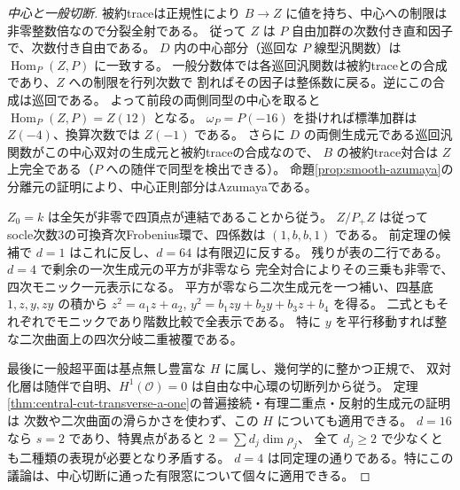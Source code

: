 \begin{proof}[中心と一般切断]
被約traceは正規性により $B\to Z$ に値を持ち、中心への制限は非零整数倍なので分裂全射である。
従って $Z$ は $P$ 自由加群の次数付き直和因子で、次数付き自由である。
$D$ 内の中心部分（巡回な $P$ 線型汎関数）は $\operatorname{Hom}_P(Z,P)$ に一致する。
一般分数体では各巡回汎関数は被約traceとの合成であり、$Z$ への制限を行列次数で
割ればその因子は整係数に戻る。逆にこの合成は巡回である。
よって前段の両側同型の中心を取ると $\operatorname{Hom}_P(Z,P)=Z(12)$ となる。
$\omega_P=P(-16)$ を掛ければ標準加群は $Z(-4)$、換算次数では $Z(-1)$ である。
さらに $D$ の両側生成元である巡回汎関数がこの中心双対の生成元と被約traceの合成なので、
$B$ の被約trace対合は $Z$ 上完全である（$P$ への随伴で同型を検出できる）。
命題\ref{prop:smooth-azumaya}の分離元の証明により、中心正則部分はAzumayaである。

$Z_0=k$ は全矢が非零で四頂点が連結であることから従う。
$Z/P_+Z$ は従ってsocle次数3の可換斉次Frobenius環で、四係数は $(1,b,b,1)$ である。
前定理の候補で $d=1$ はこれに反し、$d=64$ は有限辺に反する。
残りが表の二行である。$d=4$ で剰余の一次生成元の平方が非零なら
完全対合によりその三乗も非零で、四次モニック一元表示になる。
平方が零なら二次生成元を一つ補い、四基底 $1,z,y,zy$ の積から
$z^2=a_1z+a_2$, $y^2=b_1zy+b_2y+b_3z+b_4$ を得る。
二式ともそれぞれでモニックであり階数比較で全表示である。
特に $y$ を平行移動すれば整な二次曲面上の四次分岐二重被覆である。

最後に一般超平面は基点無し豊富な $H$ に属し、幾何学的に整かつ正規で、
双対化層は随伴で自明、$H^1(\mathcal O)=0$ は自由な中心環の切断列から従う。
定理\ref{thm:central-cut-transverse-a-one}の普遍接続・有理二重点・反射的生成元の証明は
次数や二次曲面の滑らかさを使わず、この $H$ についても適用できる。
$d=16$ なら $s=2$ であり、特異点があると $2=\sum d_j\dim\rho_j$、
全て $d_j\ge2$ で少なくとも二種類の表現が必要となり矛盾する。
$d=4$ は同定理の通りである。特にこの議論は、中心切断に通った有限窓について個々に適用できる。
\end{proof}
